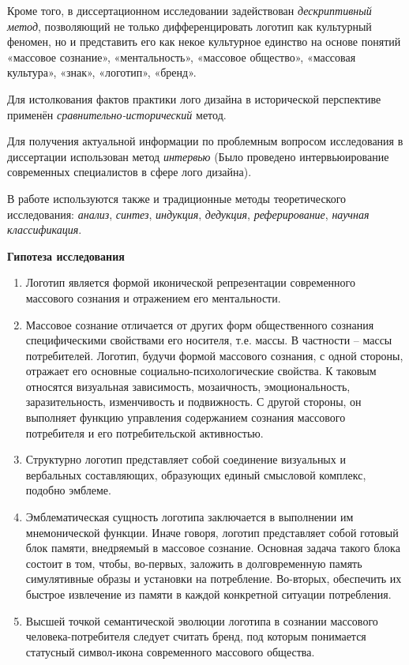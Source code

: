 Кроме того, в диссертационном исследовании задействован \emph{дескриптивный метод}, позволяющий не только дифференцировать логотип как культурный феномен, но и представить его как некое культурное единство на основе понятий «массовое сознание», «ментальность», «массовое общество», «массовая культура», «знак», «логотип», «бренд».

Для истолкования фактов практики лого дизайна в исторической перспективе применён \emph {сравнительно-исторический} метод.

Для получения актуальной информации по проблемным вопросом исследования в диссертации использован метод \emph{интервью} (Было проведено интервьюирование современных специалистов в сфере лого дизайна).

В работе используются также и традиционные методы теоретического исследования: \emph{анализ}, \emph{синтез}, \emph{индукция}, \emph{дедукция}, \emph{реферирование}, \emph{научная классификация}.

\textbf{Гипотеза исследования}
\begin{enumerate}
\item Логотип является формой иконической репрезентации современного массового сознания и отражением его ментальности.
\item Массовое сознание отличается от других форм общественного сознания специфическими свойствами его носителя, т.е. массы. В частности – массы потребителей. Логотип, будучи формой массового сознания, с одной стороны, отражает его основные социально-психологические свойства. К таковым относятся визуальная зависимость, мозаичность, эмоциональность, заразительность, изменчивость и подвижность. С другой стороны, он выполняет функцию управления содержанием сознания массового потребителя и его потребительской активностью.
\item Структурно логотип представляет собой соединение визуальных и вербальных составляющих, образующих единый смысловой комплекс, подобно эмблеме.
\item Эмблематическая сущность логотипа заключается в выполнении им мнемонической функции. Иначе говоря, логотип представляет собой готовый блок памяти, внедряемый в массовое сознание. Основная задача такого блока состоит в том, чтобы, во-первых, заложить в долговременную память симулятивные образы и установки на потребление. Во-вторых, обеспечить их быстрое извлечение из памяти в каждой конкретной ситуации потребления.
\item Высшей точкой семантической эволюции логотипа в сознании массового человека-потребителя следует считать бренд, под которым понимается статусный символ-икона современного массового общества.
\end{enumerate}

